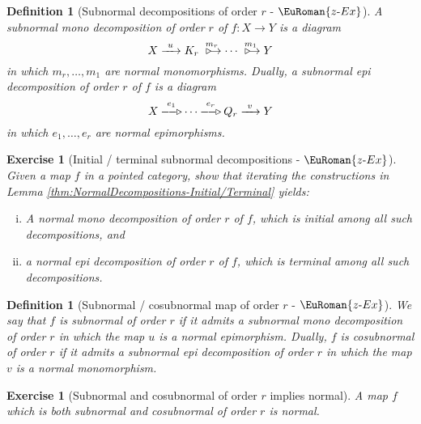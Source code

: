 \documentclass [12pt,oneside]{book}%
\theoremstyle{captionstyle}  %
\newtheorem{definition}[theorem]{Definition}
\newtheorem{exercise}[theorem]{Exercise}
\newenvironment{thmlist}{		%
	\begin{enumerate}[(i)]}{
	\end{enumerate}
}
\newenvironment{exercises}{%
	\def\FrameCommand{{\color{Maroon}\vrule width 0pt}\hspace{0pt}\fboxsep=\FrameSep}%
	\MakeFramed{\hsize=0.95\linewidth\advance\hsize-\width\FrameRestore%
		\bigskip
		\textbf{Exercises}\vspace{-2ex}\footnotesize{
		}}
}
{\endMakeFramed}
\newcommand{\Defn}[1]{\emph{#1}}
\newcommand{\hy}{\text{-}}													%
\newcommand{\XRA}[1]{\xrightarrow{\ #1\ }}
\newcommand{\from}{\colon}				%
\newcommand{\NEpi}{-\hspace{-0.8ex}-\hspace{-0.7ex}\triangleright}	%
\newcommand{\NMono}{\ \triangleright\hspace{-0.9ex}\rightarrow}			%
\newcommand{\ZExactTag}{ - {\color{Cerulean} $\EuRoman{z\hy Ex}$}}
\begin{document}
\begin{exercises}

\bigskip
\begin{definition}[Subnormal decompositions of order $r$\ZExactTag]
    \label{def:SubnormalDecomposition-Order-r}%
    A \Defn{subnormal mono decomposition of order $r$} of $f\from X\to Y$ is a diagram %
    \begin{equation*}
        X \XRA{u} K_{r} \overset{m_{r}}{\NMono} \cdots \overset{m_{1}}{\NMono} Y
    \end{equation*}
    in which $m_{r},\dots , m_{1}$ are normal monomorphisms. Dually, a \Defn{subnormal epi decomposition of order $r$} of $f$ is a diagram %
    \begin{equation*}
        X \overset{e_{1}}{\NEpi} \cdots \overset{e_{r}}{\NEpi} Q_{r} \XRA{v} Y
    \end{equation*}
    in which $e_{1},\dots ,e_{r}$ are normal epimorphisms.
\end{definition}

\begin{exercise}[Initial / terminal subnormal decompositions\ZExactTag]
    \label{exe:SubnormalDecomposition-Initial/Terminal}
    Given a map $f$ in a pointed category, show that iterating the constructions in Lemma \ref{thm:NormalDecompositions-Initial/Terminal} yields:
    \begin{thmlist}
        \item A normal mono decomposition of order $r$ of $f$, which is initial among all such decompositions, and
        \item a normal epi decomposition of order $r$ of $f$, which is terminal among all such decompositions.
    \end{thmlist}
\end{exercise}

\begin{definition}[Subnormal / cosubnormal map of order $r$\ZExactTag]
    \label{def:SubNormal/CoSubNormal-Order-r}
    We say that $f$ is \Defn{subnormal of order $r$} if it admits a subnormal mono decomposition of order $r$ in which the map $u$ is a normal epimorphism. Dually, $f$ is \Defn{cosubnormal of order $r$} if it admits a subnormal epi decomposition of order $r$ in which the map $v$ is a normal monomorphism.
\end{definition}

\begin{exercise}[Subnormal and cosubnormal of order $r$ implies normal]
    \label{exe:SubNormal/CoSubNormal-r-=>Normal}%
    A map $f$ which is both subnormal and cosubnormal of order $r$ is normal.
\end{exercise}


\end{exercises}
\end{document}
